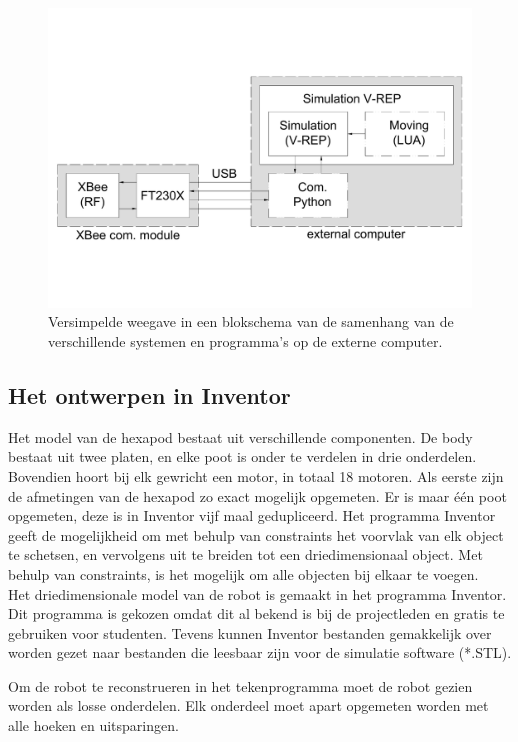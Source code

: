 \documentclass[10pt,a4paper]{article}
\begin{document}
\begin{figure}[h]
    \centering
    \includegraphics[width=1\textwidth]{blockschematic-computer}
    \caption{Versimpelde weegave in een blokschema van de samenhang van de verschillende systemen en programma's op de externe computer.}
    \label{fig:blockschematic-computer}
\end{figure}

\newpage
\subsection{Het ontwerpen in Inventor}
Het model van de hexapod bestaat uit verschillende componenten. De body bestaat uit twee platen, en elke poot is onder te verdelen in drie onderdelen. Bovendien hoort bij elk gewricht een motor, in totaal 18 motoren. Als eerste zijn de afmetingen van de hexapod zo exact mogelijk opgemeten. Er is maar \'e\'en poot opgemeten, deze is in Inventor vijf maal gedupliceerd. Het programma Inventor geeft de mogelijkheid om met behulp van constraints het voorvlak van elk object te schetsen, en vervolgens uit te breiden tot een driedimensionaal object. Met behulp van constraints, is het mogelijk om alle objecten bij elkaar te voegen.\\

Het driedimensionale model van de robot is gemaakt in het programma Inventor. Dit programma is gekozen omdat dit al bekend is bij de projectleden en gratis te gebruiken voor studenten. Tevens kunnen Inventor bestanden gemakkelijk over worden gezet naar bestanden die leesbaar zijn voor de simulatie software (*.STL).
 
Om de robot te reconstrueren in het tekenprogramma moet de robot gezien worden als losse onderdelen. Elk onderdeel moet apart opgemeten worden met alle hoeken en uitsparingen.
\end{document}
